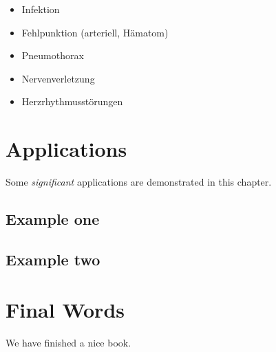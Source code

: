 \documentclass[
]{book}
\providecommand{\tightlist}{%
  \setlength{\itemsep}{0pt}\setlength{\parskip}{0pt}}
\begin{document}
\begin{itemize}
\tightlist
\item
  Infektion
\item
  Fehlpunktion (arteriell, Hämatom)
\item
  Pneumothorax
\item
  Nervenverletzung
\item
  Herzrhythmusstörungen
\end{itemize}

\hypertarget{applications}{%
\chapter{Applications}\label{applications}}

Some \emph{significant} applications are demonstrated in this chapter.

\hypertarget{example-one}{%
\section{Example one}\label{example-one}}

\hypertarget{example-two}{%
\section{Example two}\label{example-two}}

\hypertarget{final-words}{%
\chapter{Final Words}\label{final-words}}

We have finished a nice book.

  
\end{document}
